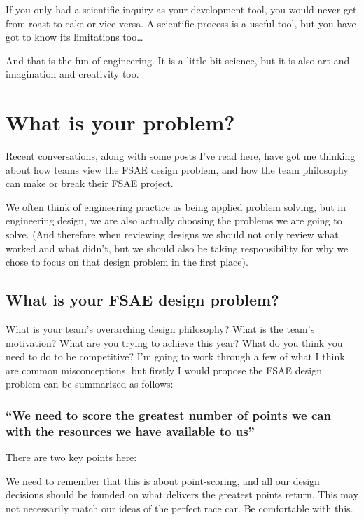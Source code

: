 \documentclass[10pt, a4paper, article, oneside, twocolumn, final]{memoir}
\begin{document}
If you only had a scientific inquiry as your development tool, you would never get from roast to cake or vice versa. A scientific process is a useful tool, but you have got to know its limitations too\ldots 

And that is the fun of engineering. It is a little bit science, but it is also art and imagination and creativity too. 



\chapter*{What is your problem?}

Recent conversations, along with some posts I've read here, have got me thinking about how teams view the FSAE design problem, and how the team philosophy can make or break their FSAE project. 

We often think of engineering practice as being applied problem solving, but in engineering design, we are also actually choosing the problems we are going to solve. (And therefore when reviewing designs we should not only review what worked and what didn't, but we should also be taking responsibility for why we chose to focus on that design problem in the first place). 

\section*{What is your FSAE design problem?}

What is your team's overarching design philosophy? What is the team's motivation? What are you trying to achieve this year? What do you think you need to do to be competitive? I'm going to work through a few of what I think are common misconceptions, but firstly I would propose the FSAE design problem can be summarized as follows: 

\subsection*{“We need to score the greatest number of points we can with the resources we have available to us”}
There are two key points here: 

We need to remember that this is about point-scoring, and all our design decisions should be founded on what delivers the greatest points return. This may not necessarily match our ideas of the perfect race car. Be comfortable with this. 
\end{document}
